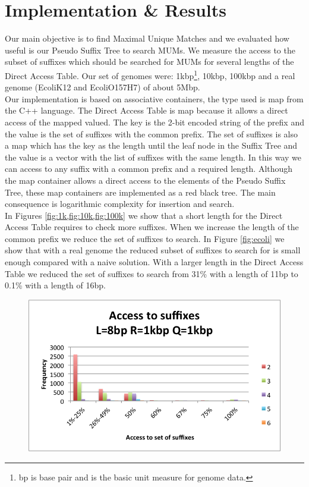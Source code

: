 \documentclass[runningheads,a4paper]{llncs}
\begin{document}
{\section{Implementation \& Results}
Our main objective is to find Maximal Unique Matches and we evaluated how useful is our Pseudo Suffix Tree to search MUMs. We measure the access to the subset of suffixes which should be searched for MUMs for several lengths of the Direct Access Table. Our set of genomes were: 1kbp\footnote{bp is base pair and is the basic unit measure for genome data.}, 10kbp, 100kbp and a real genome (EcoliK12 and EcoliO157H7) of about 5Mbp.\\
Our implementation is based on associative containers, the type used is map from the C++ language. The Direct Access Table is map because it allows a direct access of the mapped valued. The key is the 2-bit encoded string of the prefix and the value is the set of suffixes with the common prefix. The set of suffixes is also a map which has the key as the length until the leaf node in the Suffix Tree and the value is a vector with the list of suffixes with the same length. In this way we can access to any suffix with a common prefix and a required length. Although the map container allows a direct access to the elements of the Pseudo Suffix Tree, these map containers are implemented as a red black tree. The main consequence is logarithmic complexity for insertion and search.\\
In Figures \ref{fig:1k,fig:10k,fig:100k} we show that a short length for the Direct Access Table requires to check more suffixes. When we increase the length of the common prefix we reduce the set of suffixes to search. In Figure \ref{fig:ecoli} we show that with a real genome the reduced subset of suffixes to search for is small enough compared with a naive solution. With a larger length in the Direct Access Table we reduced the set of suffixes to search from 31\% with a length of 11bp to 0.1\% with a length of 16bp.\\
\begin{figure}
\centering
\includegraphics[scale=0.5]{1k.png}

\end{figure}}
\end{document}
